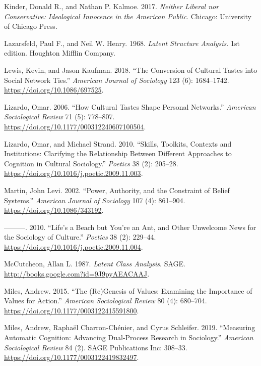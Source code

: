 \documentclass[12pt,]{article}
\begin{document}
\leavevmode\hypertarget{ref-kinder2017}{}%
Kinder, Donald R., and Nathan P. Kalmoe. 2017. \emph{Neither Liberal nor Conservative: Ideological Innocence in the American Public}. Chicago: University of Chicago Press.

\leavevmode\hypertarget{ref-lazarsfeld1968}{}%
Lazarsfeld, Paul F., and Neil W. Henry. 1968. \emph{Latent Structure Analysis}. 1st edition. Houghton Mifflin Company.

\leavevmode\hypertarget{ref-lewis2018}{}%
Lewis, Kevin, and Jason Kaufman. 2018. ``The Conversion of Cultural Tastes into Social Network Ties.'' \emph{American Journal of Sociology} 123 (6): 1684--1742. \url{https://doi.org/10.1086/697525}.

\leavevmode\hypertarget{ref-lizardo2006}{}%
Lizardo, Omar. 2006. ``How Cultural Tastes Shape Personal Networks.'' \emph{American Sociological Review} 71 (5): 778--807. \url{https://doi.org/10.1177/000312240607100504}.

\leavevmode\hypertarget{ref-lizardo2010a}{}%
Lizardo, Omar, and Michael Strand. 2010. ``Skills, Toolkits, Contexts and Institutions: Clarifying the Relationship Between Different Approaches to Cognition in Cultural Sociology.'' \emph{Poetics} 38 (2): 205--28. \url{https://doi.org/10.1016/j.poetic.2009.11.003}.

\leavevmode\hypertarget{ref-martin2002}{}%
Martin, John Levi. 2002. ``Power, Authority, and the Constraint of Belief Systems.'' \emph{American Journal of Sociology} 107 (4): 861--904. \url{https://doi.org/10.1086/343192}.

\leavevmode\hypertarget{ref-martin2010}{}%
---------. 2010. ``Life's a Beach but You're an Ant, and Other Unwelcome News for the Sociology of Culture.'' \emph{Poetics} 38 (2): 229--44. \url{https://doi.org/10.1016/j.poetic.2009.11.004}.

\leavevmode\hypertarget{ref-mccutcheon1987}{}%
McCutcheon, Allan L. 1987. \emph{Latent Class Analysis}. SAGE. \url{http://books.google.com?id=9J9pyAEACAAJ}.

\leavevmode\hypertarget{ref-miles2015}{}%
Miles, Andrew. 2015. ``The (Re)Genesis of Values: Examining the Importance of Values for Action.'' \emph{American Sociological Review} 80 (4): 680--704. \url{https://doi.org/10.1177/0003122415591800}.

\leavevmode\hypertarget{ref-miles2019}{}%
Miles, Andrew, Raphaël Charron-Chénier, and Cyrus Schleifer. 2019. ``Measuring Automatic Cognition: Advancing Dual-Process Research in Sociology.'' \emph{American Sociological Review} 84 (2). SAGE Publications Inc: 308--33. \url{https://doi.org/10.1177/0003122419832497}.
\end{document}
